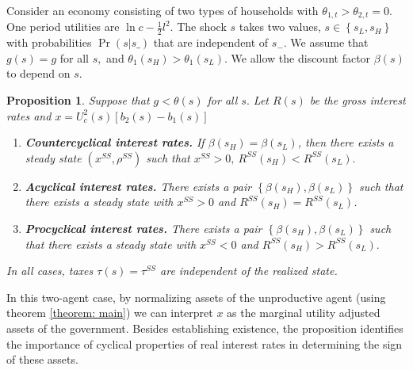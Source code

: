\documentclass[thmsb,11pt]{article}
\newtheorem{proposition}{Proposition}
\begin{document}
Consider an economy consisting of  two types of households with $%
\theta _{1,t}>\theta _{2,t}=0$. One period utilities are $\ln c-\frac{1}{2}%
l^{2}.$ The shock $s$  takes  two values, $s\in \left\{
s_{L},s_{H}\right\} $ with probabilities $\Pr \left( s|s\_\right) $ that are
independent of $s_{-}.$ We assume that $g\left( s\right) =g$ for all $s,$
and $\theta _{1}\left( s_{H}\right) >\theta _{1}\left( s_{L}\right) .$ We allow the discount factor $\beta(s)$ to depend on  $s.$

\smallskip

\begin{proposition}
\label{prop: long run forces}\smallskip Suppose that $g<\theta (s)$ for all $%
s.$ Let $R(s)$ be the gross interest rates and $x=U^2_c(s)\left[b_2(s)-b_1(s)\right]$

\begin{enumerate}
\item \textbf{Countercyclical interest rates.} If $\beta \left( s_{H}\right) =\beta \left( s_{L}\right)$, then
there exists a steady state $\left( x^{SS},\rho ^{SS}\right) $ such that $%
x^{SS}>0,\ R^{SS}\left( s_{H}\right) <R^{SS}\left( s_{L}\right) .$
\item \textbf{Acyclical interest rates.}  There exists a pair $\left\{ \beta \left( s_{H}\right) ,\beta \left( s_{L}\right)
\right\} $ such that there exists a steady state with $x^{SS}>0$ and $R^{SS}\left(
s_{H}\right) =R^{SS}\left( s_{L}\right)$.
\item \textbf{Procyclical interest rates.} There exists a pair  $\left\{ \beta \left( s_{H}\right) ,\beta \left( s_{L}\right)
\right\} $ such that there exists a steady state with $x^{SS}<0$ and  $R^{SS}\left( s_{H}\right) >R^{SS}\left( s_{L}\right) .$
\end{enumerate}
In all cases, taxes $\tau(s)=\tau^{SS}$ are independent of the realized state.
\end{proposition}


In this two-agent case, by normalizing assets of the unproductive agent (using theorem \ref{theorem: main}) we can interpret $x$ as the marginal utility adjusted assets of the government. Besides establishing existence, the proposition identifies the importance of cyclical properties of real interest rates in determining the sign of these assets.
\end{document}
